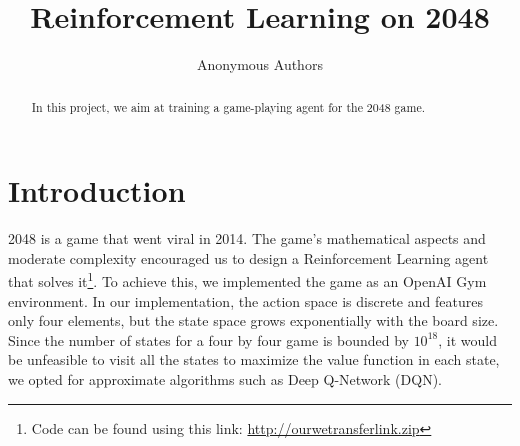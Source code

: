 \documentclass[journal, a4paper]{IEEEtran}
\begin{document}
\title{Reinforcement Learning on 2048}
\author{Anonymous Authors}
\maketitle

\begin{abstract}
    In this project, we aim at training a game-playing agent for the 2048 game. 
    
    
	
\end{abstract}

\section{Introduction}
2048 is a game that went viral in 2014. The game's mathematical aspects and moderate complexity encouraged us to design a Reinforcement Learning agent that solves it\footnote{Code can be found using this link: \url{http://ourwetransferlink.zip}}. To achieve this, we implemented the game as an OpenAI Gym environment. In our implementation, the action space is discrete and features only four elements, but the state space grows exponentially with the board size. Since the number of states for a four by four game is bounded by $10^{18}$, it would be unfeasible to visit all the states to maximize the value function in each state, we opted for approximate algorithms such as Deep Q-Network (DQN). 
\end{document}
